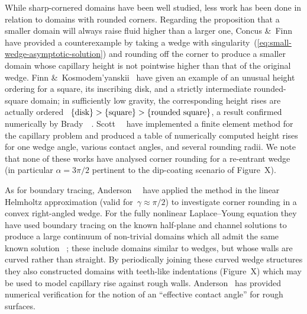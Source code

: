 While sharp-cornered domains have been well studied,
less work has been done in relation to domains with rounded corners.
Regarding the proposition that
a smaller domain will always raise fluid higher than a larger one,
Concus \&~Finn~\cite{concus-1976-height-capillary-surface}
have provided a counterexample
by taking a wedge with singularity~(\ref{eq:small-wedge-asymptotic-solution})
and rounding off the corner
to produce a smaller domain whose capillary height
is not pointwise higher than that of the original wedge.
Finn \&~Kosmodem'yanskii~%
  \cite{finn-2002-unusual-comparison-properties-capillary}
have given an example of an unusual height ordering
for a square, its inscribing disk,
and a strictly intermediate rounded-square domain;
in sufficiently low gravity,
the corresponding height rises are actually ordered~%
$\left\{\textnormal{disk}\right\} > \left\{\textnormal{square}\right\} > \left\{\textnormal{rounded square}\right\}$,
a result confirmed numerically
by Brady~\etal~\cite{brady-2003-capillary-rise-nesting-cylinders}.
Scott~\etal~\cite{scott-2005-computation-capillary-laplace-young}
have implemented a finite element method for the capillary problem
and produced a table of numerically computed height rises
for one wedge angle, various contact angles, and several rounding radii.
We note that none of these works
have analysed corner rounding for a re-entrant wedge
(in particular $\alpha = 3\pi/2$ pertinent to the dip-coating scenario
of Figure~X). %

As for boundary tracing,
Anderson~\etal~\cite{anderson-2007-boundary-tracing-ii-applications}
have applied the method in the linear Helmholtz approximation
(valid for~$\gamma \approx \pi/2$)
to investigate corner rounding in a convex right-angled wedge.
For the fully nonlinear Laplace--Young equation
they have used boundary tracing
on the known half-plane and channel solutions
to produce a large continuum of non-trivial domains
which all admit the same known solution~%
  \cite{anderson-2006-exact-solutions-laplace-young};
these include domains similar to wedges,
but whose walls are curved rather than straight.
By periodically joining these curved wedge structures
they also constructed domains with teeth-like indentations
(Figure~X) %
which may be used to model capillary rise against rough walls.
Anderson~\cite{anderson-2002-thesis-boundary-tracing-pdes}
has provided numerical verification
for the notion of an ``effective contact angle'' for rough surfaces.

